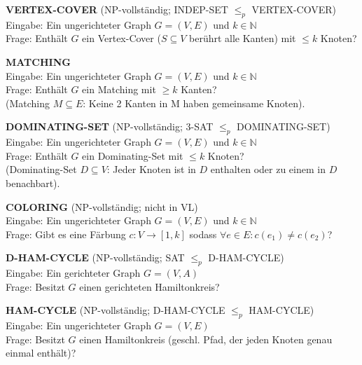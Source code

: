 \documentclass[a4paper,graphics,11pt]{article}
\begin{document}
\strut

\textbf{VERTEX-COVER} (\textsf{NP}-vollständig; INDEP-SET $\leq_p$ VERTEX-COVER)
\\[5pt]
Eingabe: Ein ungerichteter Graph $G = (V,E)$ und $k \in \mathbb{N}$
\\[5pt]
Frage: Enthält $G$ ein Vertex-Cover ($S \subseteq V$ berührt alle Kanten) mit $\leq k$ Knoten?

\newpage

\textbf{MATCHING}
\\[5pt]
Eingabe: Ein ungerichteter Graph $G = (V,E)$ und $k \in \mathbb{N}$
\\[5pt]
Frage: Enthält $G$ ein Matching mit $\geq k$ Kanten?\\
(Matching $M \subseteq E$: Keine 2 Kanten in M haben gemeinsame Knoten).

\strut

\textbf{DOMINATING-SET} (\textsf{NP}-vollständig; 3-SAT $\leq_p$ DOMINATING-SET)
\\[5pt]
Eingabe: Ein ungerichteter Graph $G = (V,E)$ und $k \in \mathbb{N}$
\\[5pt]
Frage: Enthält $G$ ein Dominating-Set mit $\leq k$ Knoten?\\[5pt]
(Dominating-Set $D \subseteq V$: Jeder Knoten ist in $D$ enthalten oder zu einem in $D$ benachbart).

\strut

\textbf{COLORING} (\textsf{NP}-vollständig; nicht in VL)
\\[5pt]
Eingabe: Ein ungerichteter Graph $G = (V,E)$ und $k \in \mathbb{N}$
\\[5pt]
Frage: Gibt es eine Färbung $c : V \to [1,k]$ sodass $\forall e \in E : c(e_1) \neq c(e_2)$?

\strut

\textbf{D-HAM-CYCLE} (\textsf{NP}-vollständig; SAT $\leq_p$ D-HAM-CYCLE)
\\[5pt]
Eingabe: Ein gerichteter Graph $G = (V,A)$
\\[5pt]
Frage: Besitzt $G$ einen gerichteten Hamiltonkreis?

\strut

\textbf{HAM-CYCLE} (\textsf{NP}-vollständig; D-HAM-CYCLE $\leq_p$ HAM-CYCLE)
\\[5pt]
Eingabe: Ein ungerichteter Graph $G = (V,E)$
\\[5pt]
Frage: Besitzt $G$ einen Hamiltonkreis (geschl. Pfad, der jeden Knoten genau einmal enthält)?

\strut
\end{document}
